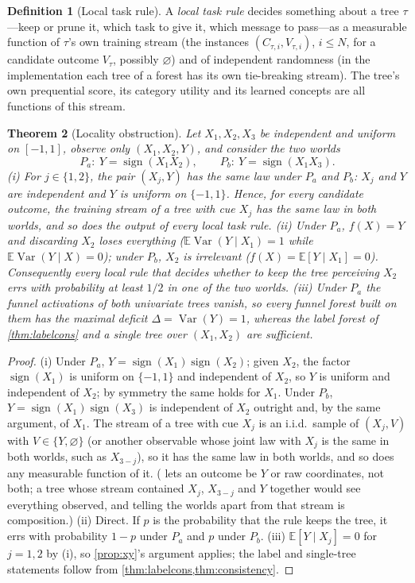 \documentclass[11pt]{article}
\newtheorem{theorem}{Theorem}
\theoremstyle{definition}
\newtheorem{definition}[theorem]{Definition}
\theoremstyle{remark}
\newcommand{\E}{\mathbb{E}}
\newcommand{\Var}{\operatorname{Var}}
\begin{document}
\begin{definition}[Local task rule]\label{def:local}
A \emph{local task rule} decides something about a tree $\tau$---keep or prune it,
which task to give it, which message to pass---as a measurable function of $\tau$'s own
training stream (the instances $(C_{\tau,i},V_{\tau,i})$, $i\le N$, for a candidate
outcome $V_\tau$, possibly $\varnothing$) and of independent randomness (in the
implementation each tree of a forest has its own tie-breaking stream).  The tree's own
prequential score, its category utility and its learned concepts are all functions of
this stream.
\end{definition}

\begin{theorem}[Locality obstruction]\label{thm:locality}
Let $X_1,X_2,X_3$ be independent and uniform on $[-1,1]$, observe only $(X_1,X_2,Y)$,
and consider the two worlds
\[
  P_a:\ Y=\operatorname{sign}(X_1X_2),\qquad P_b:\ Y=\operatorname{sign}(X_1X_3).
\]
(i) For $j\in\{1,2\}$, the pair $(X_j,Y)$ has the same law under $P_a$ and $P_b$: $X_j$
and $Y$ are independent and $Y$ is uniform on $\{-1,1\}$.  Hence, for every candidate
outcome, the training stream of a tree with cue $X_j$ has the same law in both worlds,
and so does the output of every local task rule.  (ii) Under $P_a$, $f(X)=Y$ and
discarding $X_2$ loses everything ($\E\Var(Y\mid X_1)=1$ while $\E\Var(Y\mid X)=0$);
under $P_b$, $X_2$ is irrelevant ($f(X)=\E[Y\mid X_1]=0$).  Consequently every local
rule that decides whether to keep the tree perceiving $X_2$ errs with probability at
least $1/2$ in one of the two worlds.  (iii) Under $P_a$ the funnel activations of both
univariate trees vanish, so every funnel forest built on them has the maximal deficit
$\Delta=\Var(Y)=1$, whereas the label forest of \cref{thm:labelcons} and a single tree
over $(X_1,X_2)$ are sufficient.
\end{theorem}
\begin{proof}
(i) Under $P_a$, $Y=\operatorname{sign}(X_1)\operatorname{sign}(X_2)$; given $X_2$, the
factor $\operatorname{sign}(X_1)$ is uniform on $\{-1,1\}$ and independent of $X_2$, so
$Y$ is uniform and independent of $X_2$; by symmetry the same holds for $X_1$.  Under
$P_b$, $Y=\operatorname{sign}(X_1)\operatorname{sign}(X_3)$ is independent of $X_2$
outright and, by the same argument, of $X_1$.  The stream of a tree with cue $X_j$ is an
i.i.d.\ sample of $(X_j,V)$ with $V\in\{Y,\varnothing\}$ (or another observable whose
joint law with $X_j$ is the same in both worlds, such as $X_{3-j}$), so it has the same
law in both worlds, and so does any measurable function of it.  ( lets an
outcome be $Y$ or raw coordinates, not both; a tree whose stream contained $X_j$, $X_{3-j}$
and $Y$ together would see everything observed, and telling the worlds apart from that
stream is composition.)  (ii) Direct.  If $p$ is
the probability that the rule keeps the tree, it errs with probability $1-p$ under
$P_a$ and $p$ under $P_b$.  (iii) $\E[Y\mid X_j]=0$ for $j=1,2$ by (i), so
\cref{prop:xy}'s argument applies; the label and single-tree statements follow from
\cref{thm:labelcons,thm:consistency}.
\end{proof}
\end{document}
